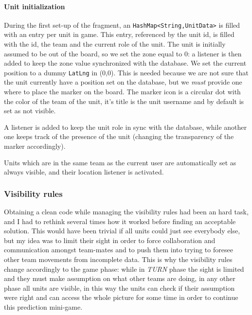 				\paragraph{Unit initialization}
				
				During the first set-up of the fragment, an \lstinline|HashMap<String,UnitData>| is filled with an entry per unit in game.
				This entry, referenced by the unit id, is filled with the id, the team and the current role of the unit.
				The unit is initially assumed to be out of the board, so we set the zone equal to 0: a listener is then added to keep the zone value synchronized with the database.
				We set the current position to a dummy \lstinline|LatLng| in (0,0). This is needed because we are not sure that the unit currently have a position set on the database, but we \emph{must} provide one where to place the marker on the board.
				The marker icon is a circular dot with the color of the team of the unit, it's title is the unit username and by default is set as not visible.
				
				A listener is added to keep the unit role in sync with the database, while another one keeps track of the presence of the unit (changing the transparency of the marker accordingly).
				
				Units which are in the same team as the current user are automatically set as always visible, and their location listener is activated.
				
			
			\subsubsection{Visibility rules} \label{focus:map:visibility}
		
				Obtaining a clean code while managing the visibility rules had been an hard task, and I had to rethink several times how it worked before finding an acceptable solution.
				This would have been trivial if all units could just see everybody else, but my idea was to limit their sight in order to force collaboration and communication amongst team-mates and to push them into trying to foresee other team movements from incomplete data.
				This is why the visibility rules change accordingly to the game phase: while in \emph{TURN} phase the sight is limited and they must make assumption on what other teams are doing, in any other phase all units are visible, in this way the units can check if their assumption were right and can access the whole picture for some time in order to continue this prediction mini-game.
				
